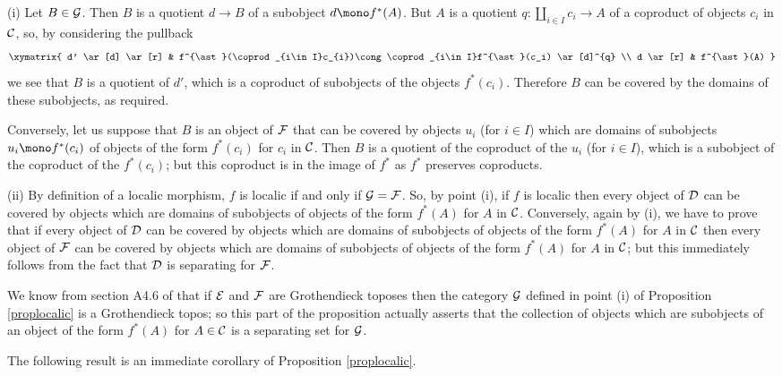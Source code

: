 \documentclass[a4paper,12pt]{article}
\begin{document}
\begin{proofs}
	(i) Let $B\in {\cal G}$. Then $B$ is a quotient $d\to B$ of a subobject $d\mono f^{\ast}(A)$. But $A$ is a quotient $q:\coprod_{i\in I}c_{i}\to A$ of a coproduct of objects $c_{i}$ in $\cal C$, so, by considering the pullback
	\[
	\xymatrix{
		d' \ar[d] \ar[r] & f^{\ast}(\coprod_{i\in I}c_{i})\cong \coprod_{i\in I}f^{\ast}(c_i) \ar[d]^{q}  \\
		d \ar[r] & f^{\ast}(A) } 
	\] 
	we see that $B$ is a quotient of $d'$, which is a coproduct of subobjects of the objects $f^{\ast}(c_i)$. Therefore $B$ can be covered by the domains of these subobjects, as required.
	
	Conversely, let us suppose that $B$ is an object of $\cal F$ that can be covered by objects $u_{i}$ (for $i\in I$) which are domains of subobjects $u_{i} \mono f^{\ast}(c_{i})$ of objects of the form $f^{\ast}(c_{i})$ for $c_{i}$ in $\cal C$. Then $B$ is a quotient of the coproduct of the $u_{i}$ (for $i\in I$), which is a subobject of the coproduct of the $f^{\ast}(c_{i})$; but this coproduct is in the image of $f^{\ast}$ as $f^{\ast}$ preserves coproducts. 
	
	(ii) By definition of a localic morphism, $f$ is localic if and only if ${\cal G}={\cal F}$. So, by point (i), if $f$ is localic then every object of $\cal D$ can be covered by objects which are domains of subobjects of objects of the form $f^{\ast}(A)$ for $A$ in $\cal C$. Conversely, again by (i), we have to prove that if every object of $\cal D$ can be covered by objects which are domains of subobjects of objects of the form $f^{\ast}(A)$ for $A$ in $\cal C$ then every object of $\cal F$ can be covered by objects which are domains of subobjects of objects of the form $f^{\ast}(A)$ for $A$ in $\cal C$; but this immediately follows from the fact that $\cal D$ is separating for $\cal F$.  
\end{proofs}

\begin{remark}\label{remseparatingsetlocalic}
	We know from section A4.6 of \cite{El} that if $\cal E$ and $\cal F$ are Grothendieck toposes then the category $\cal G$ defined in point (i) of Proposition \ref{proplocalic} is a Grothendieck topos; so this part of the proposition actually asserts that the collection of objects which are subobjects of an object of the form $f^{\ast}(A)$ for $A\in {\cal C}$ is a separating set for $\cal G$. 
\end{remark}

The following result is an immediate corollary of Proposition \ref{proplocalic}.
\end{document}
